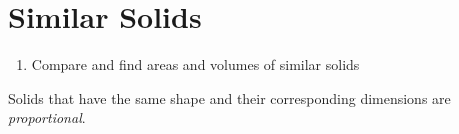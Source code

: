 \documentclass{article}
\begin{document}
\section*{Similar Solids}

\begin{tcolorbox}[colframe=orange!70!white, coltitle=black, title=\textbf{Today I Can}]
\begin{enumerate}
    \item Compare and find areas and volumes of similar solids
\end{enumerate}
\end{tcolorbox}
\smallskip

\begin{tcolorbox}[colframe=black!20!white, opacitybacktitle=0.1, coltitle=black, title=\textbf{Similar Solids}]
Solids that have the same shape and their corresponding dimensions are \emph{proportional}.
\end{tcolorbox}
\end{document}
